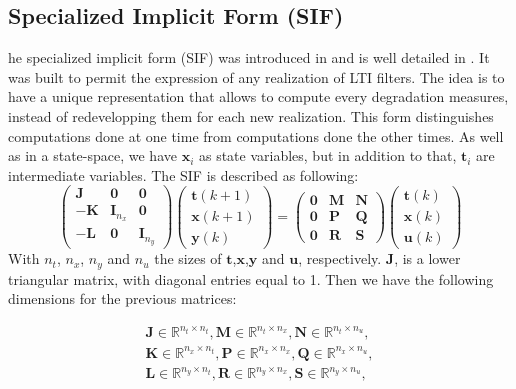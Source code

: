 	\subsection{Specialized Implicit Form (SIF)}
	he specialized implicit form (SIF) was introduced in \cite{} and is well detailed in \cite{}. It was built to permit the
	expression of any realization of LTI filters. The idea is to have a unique representation that allows to compute
	every degradation measures, instead of redevelopping them for each new realization.
	This form distinguishes computations done at one time from computations done the other times. As well as
	in a state-space, we have $\boldsymbol{x}_i$ as state variables, but in addition to that, $\boldsymbol{t}_i$ are intermediate variables.
	The SIF is described as following:
	\begin{equation} \label{sifdef}
		\begin{pmatrix}
			\boldsymbol{J} & \boldsymbol{0} & \boldsymbol{0} \\
			\boldsymbol{-K} & \boldsymbol{I}_{n_x} & \boldsymbol{0} \\
			\boldsymbol{-L} & \boldsymbol{0} & \boldsymbol{I}_{n_y} 
		\end{pmatrix}
		\begin{pmatrix}
			\boldsymbol{t} (k+1)  \\
			\boldsymbol{x} (k+1)  \\
			\boldsymbol{y} (k) 
		\end{pmatrix}
		=
		\begin{pmatrix}
			\boldsymbol{0} & \boldsymbol{M} & \boldsymbol{N} \\
			\boldsymbol{0} & \boldsymbol{P} & \boldsymbol{Q} \\
			\boldsymbol{0} & \boldsymbol{R} & \boldsymbol{S} 
		\end{pmatrix}
		\begin{pmatrix}
			\boldsymbol{t} (k)  \\
			\boldsymbol{x} (k)  \\
			\boldsymbol{u} (k) 
		\end{pmatrix}
	\end{equation}
	With $n_t$, $n_x$, $n_y$ and $n_u$ the sizes of $\boldsymbol{t}$,$\boldsymbol{x}$,$\boldsymbol{y}$ and $\boldsymbol{u}$, respectively.
	$\boldsymbol{J}$, is a lower triangular matrix, with
	diagonal entries equal to 1. Then we have the following dimensions for the previous matrices:

	\begin{eqnarray}
		\boldsymbol{J} \in \mathbb{R}^{n_t \times n_t},\boldsymbol{M} \in \mathbb{R}^{n_t \times n_x},\boldsymbol{N} \in \mathbb{R}^{n_t \times n_u}, \nonumber \\
		\boldsymbol{K} \in \mathbb{R}^{n_x \times n_t},\boldsymbol{P} \in \mathbb{R}^{n_x \times n_x},\boldsymbol{Q} \in \mathbb{R}^{n_x \times n_u}, \\
		\boldsymbol{L} \in \mathbb{R}^{n_y \times n_t},\boldsymbol{R} \in \mathbb{R}^{n_y \times n_x},\boldsymbol{S} \in \mathbb{R}^{n_y \times n_u}, \nonumber \\
	\end{eqnarray}

